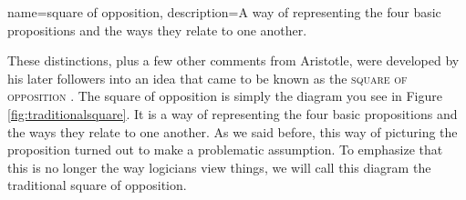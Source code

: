 {
name=square of opposition,
description={A way of representing the four basic propositions and the ways they relate to one another.}
}


These distinctions, plus a few other comments from Aristotle, were developed by his later followers into an idea that came to be known as the \textsc{\gls{square of opposition}} \label{def:Squareofopposition}. The square of opposition is simply the diagram you see in Figure \ref{fig:traditionalsquare}. It is a way of representing the four basic propositions and the ways they relate to one another.  As we said before, this way of picturing the proposition turned out to make a problematic assumption. To emphasize that this is no longer the way logicians view things, we will call this diagram the traditional square of opposition.

